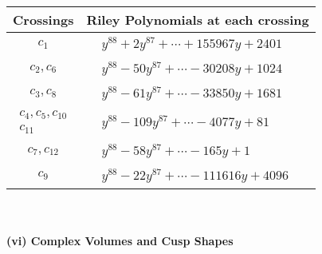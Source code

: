 \documentclass[1p]{elsarticle_modified}
\theoremstyle{definition}
\begin{document}
\begin{tabular}{m{50pt}|m{274pt}}
Crossings & \hspace{64pt}Riley Polynomials at each crossing \\
\hline $$\begin{aligned}c_{1}\end{aligned}$$&$\begin{aligned}
&y^{88}+2 y^{87}+\cdots+155967 y+2401
\end{aligned}$\\
\hline $$\begin{aligned}c_{2},c_{6}\end{aligned}$$&$\begin{aligned}
&y^{88}-50 y^{87}+\cdots-30208 y+1024
\end{aligned}$\\
\hline $$\begin{aligned}c_{3},c_{8}\end{aligned}$$&$\begin{aligned}
&y^{88}-61 y^{87}+\cdots-33850 y+1681
\end{aligned}$\\
\hline $$\begin{aligned}c_{4},c_{5},c_{10}\\c_{11}\end{aligned}$$&$\begin{aligned}
&y^{88}-109 y^{87}+\cdots-4077 y+81
\end{aligned}$\\
\hline $$\begin{aligned}c_{7},c_{12}\end{aligned}$$&$\begin{aligned}
&y^{88}-58 y^{87}+\cdots-165 y+1
\end{aligned}$\\
\hline $$\begin{aligned}c_{9}\end{aligned}$$&$\begin{aligned}
&y^{88}-22 y^{87}+\cdots-111616 y+4096
\end{aligned}$\\
\hline
\end{tabular}\\~\\
\newpage\flushleft \textbf{(vi) Complex Volumes and Cusp Shapes}
\end{document}
